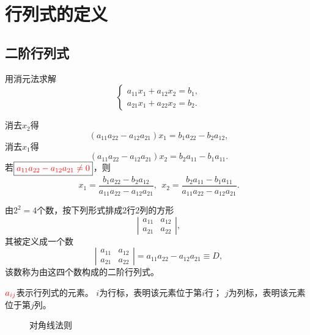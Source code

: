 \section{行列式的定义}
\subsection{二阶行列式}
\begin{li}
  用消元法求解
  $$
  \left \lbrace
    \begin{array}{l}
      a_{11} x_1 + a_{12} x_2 = b_1, \\[0.2cm]
      a_{21} x_1 + a_{22} x_2 = b_2.
    \end{array}
  \right.
  $$
\end{li}  
消去$x_2$得
$$
(a_{11}a_{22}-a_{12}a_{21})x_1 = b_1 a_{22} - b_2 a_{12},
$$
消去$x_1$得
$$
(a_{11}a_{22}-a_{12}a_{21})x_2 = b_2 a_{11} - b_1 a_{11}.
$$
若$\boxed{\textcolor{red}{a_{11}a_{22}-a_{12}a_{21}\ne0}}$，则
$$
x_1 = \frac{b_1 a_{22} - b_2 a_{12}}{a_{11}a_{22}-a_{12}a_{21}}, \ \
x_2 = \frac{b_2 a_{11} - b_1 a_{11}}{a_{11}a_{22}-a_{12}a_{21}}.
$$

\begin{dingyi}[二阶行列式]
  由$2^2=4$个数，按下列形式排成2行2列的方形
  $$
  \left|
    \begin{array}{cc}
      a_{11} & a_{12} \\[0.2cm]
      a_{21} & a_{22} 
    \end{array}
  \right|,
  $$
  其被定义成一个数
  $$
  \left|
    \begin{array}{cc}
      a_{11} & a_{12} \\[0.2cm]
      a_{21} & a_{22} 
    \end{array}
  \right| = a_{11}a_{22} - a_{12}a_{21} \equiv D,
  $$
  该数称为由这四个数构成的二阶行列式。
\end{dingyi}
$\textcolor{red}{a_{ij}}$表示行列式的元素。
$i$为行标，表明该元素位于第$i$行；
$j$为列标，表明该元素位于第$j$列。
\begin{figure}[htbp]
  \centering      
  \caption{对角线法则}
\end{figure}

